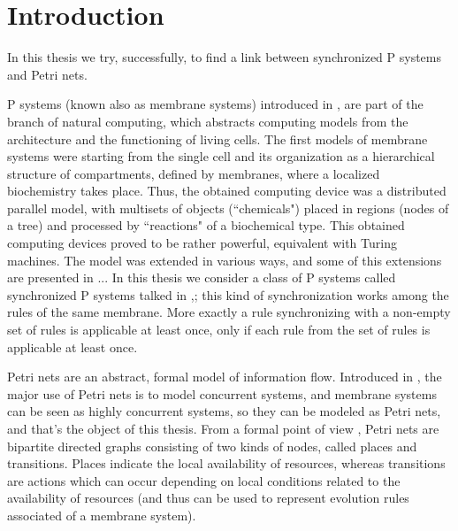 \chapter{Introduction}

In this thesis we try, successfully, to find a link between synchronized P systems and Petri nets.

P systems (known also as membrane systems) introduced in \cite{puaun2000computing}, are part of the branch of natural computing, which abstracts computing models from the architecture and the functioning of living cells.
The ﬁrst models of membrane systems were starting from the single cell and its organization as a hierarchical structure of compartments, deﬁned by membranes, where a localized biochemistry takes place.
Thus, the obtained computing device was a distributed parallel model, with multisets of objects (“chemicals") placed in regions (nodes of a tree) and processed by “reactions" of a biochemical type.
This obtained computing devices proved to be rather powerful, equivalent with Turing machines.
The model was extended in various ways, and some of this extensions are presented in ...
In this thesis we consider a class of P systems called synchronized P systems talked in \cite{aman2019synchronization},\cite{aman2022power}; this kind of synchronization works among the rules of the same membrane.
More exactly a rule synchronizing with a non-empty set of rules is applicable at least once, only if each rule from the set of rules is applicable at least once.

Petri nets are an abstract, formal model of information flow.
Introduced in \cite{petri1962kommunikation}, the major use of Petri nets is to model concurrent systems, and membrane systems can be seen as highly concurrent systems, so they can be modeled as Petri nets, and that's the object of this thesis.
From a formal point of view , Petri nets are bipartite directed graphs consisting of two kinds of nodes, called places and transitions.
Places indicate the local availability of resources, whereas transitions are actions which can occur depending on local conditions related to the availability of resources (and thus can be used to represent evolution rules associated of a membrane system).